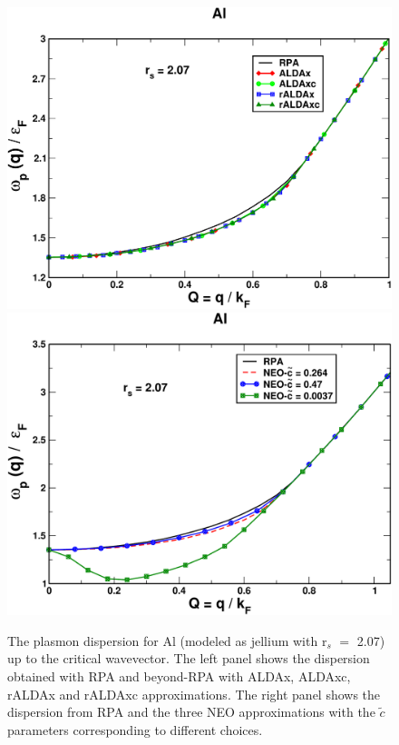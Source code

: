 \documentclass[aps,amsmath,amssymb, preprint, 12pt]{revtex4-1}
\begin{document}


\begin{figure}[h!]	
	\includegraphics[scale=0.3]{figure_2a.pdf}
	\includegraphics[scale=0.3]{figure_2b.pdf}
	\caption{The plasmon dispersion for Al (modeled as jellium with r$_s$ $=$ 2.07) up to the critical wavevector. The left panel shows the dispersion obtained with RPA and beyond-RPA with ALDAx, ALDAxc, rALDAx and rALDAxc approximations. The right panel shows the dispersion from RPA and the three NEO approximations with the  \( \widetilde{c} \)  parameters corresponding to different choices.}
	\label{fig1}
\end{figure}
\end{document}
